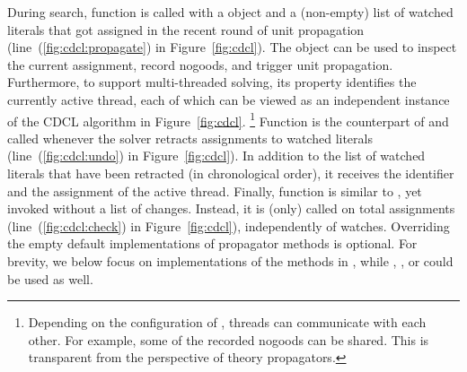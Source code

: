 During search, function  is called with a  object
and a (non-empty) list of watched literals that got assigned in the recent round of unit propagation (line~(\ref{fig:cdcl:propagate}) in Figure~\ref{fig:cdcl}).
The  object can be used to inspect the current assignment, record nogoods, and trigger unit propagation.
Furthermore, to support multi-threaded solving,
its  property identifies the currently active thread,
each of which can be viewed as an independent instance of the CDCL algorithm in Figure~\ref{fig:cdcl}.%
\footnote{%
Depending on the configuration of \clasp, threads can communicate with each other.
For example, some of the recorded nogoods can be shared.
This is transparent from the perspective of theory propagators.}
%
Function  is the counterpart of 
and called whenever the solver retracts assignments to watched literals (line~(\ref{fig:cdcl:undo}) in Figure~\ref{fig:cdcl}).
In addition to the list of watched literals that have been retracted (in chronological order),
it receives the identifier and the assignment of the active thread.
%
Finally, function  is similar to ,
yet invoked without a list of changes.
Instead, it is (only) called on total assignments
(line~(\ref{fig:cdcl:check}) in Figure~\ref{fig:cdcl}), independently of watches.
%
Overriding the empty default implementations of propagator methods is optional.
For brevity, we below focus on implementations of the methods in \python,
while \C, \cpp, or \lua{} could be used as well.


